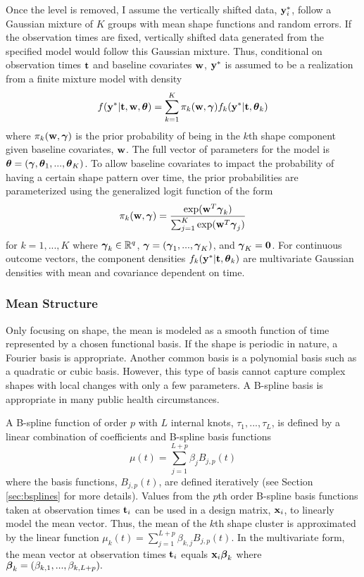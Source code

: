 Once the level is removed, I assume the vertically shifted data, $\mathbf y_{i}^{*}$, follow a Gaussian mixture of $K$ groups with mean shape functions and random errors. If the observation times are fixed, vertically shifted data generated from the specified model would follow this Gaussian mixture. Thus, conditional on observation times $\mathbf t$ and baseline covariates $\mathbf w$, $\mathbf y^{*}$ is assumed to be a realization from a finite mixture model with density
\begin{align*}
 f(\mathbf y^{*}|\mathbf t,\mathbf w,\boldsymbol\theta) =  \sum^{K}_{k=1}\pi_{k}(\mathbf w,\boldsymbol \gamma)f_{k}( \mathbf y^{*}|\mathbf t,\boldsymbol\theta_{k})
\end{align*}
where $\pi_{k}(\mathbf w,\boldsymbol \gamma)$ is the prior probability of being in the $k$th shape component given baseline covariates, $\mathbf w$. The full vector of parameters for the model is $\boldsymbol\theta = (\boldsymbol\gamma,\boldsymbol\theta_{1},...,\boldsymbol\theta_{K})$. To allow baseline covariates to impact the probability of having a certain shape pattern over time, the prior probabilities are parameterized using the generalized logit function of the form
$$\pi_{k}(\mathbf w,\boldsymbol\gamma)=\frac{\exp(\mathbf w^{T}\boldsymbol\gamma_{k})}{\sum_{j=1}^{K}\exp(\mathbf w^{T}\boldsymbol\gamma_{j})}$$ 
for $k=1,...,K$ where $\boldsymbol \gamma_{k}\in\mathbb{R}^{q}$, $\boldsymbol\gamma = (\boldsymbol\gamma_{1},...,\boldsymbol\gamma_{K})$, and $\boldsymbol\gamma_{K}=\mathbf 0$. For continuous outcome vectors, the component densities $f_{k}(\mathbf y^{*}|\mathbf t,\boldsymbol\theta_{k})$ are multivariate Gaussian densities with mean and covariance dependent  on time.

\subsubsection{Mean Structure}
Only focusing on shape, the mean is modeled as a smooth function of time represented by a chosen functional basis. If the shape is periodic in nature, a Fourier basis is appropriate. Another common basis is a polynomial basis such as a quadratic or cubic basis. However, this type of basis cannot capture complex shapes with local changes with only a few parameters. A B-spline basis is appropriate in many public health circumstances.

A B-spline function of order $p$ with $L$ internal knots, $\tau_{1},...,\tau_{L}$, is defined by a linear combination of coefficients and B-spline basis functions
$$\mu(t) = \sum^{L+p}_{j=1} \beta_j B_{j,p}(t)$$
where the basis functions, $B_{j,p}(t)$, are defined iteratively \cite{deboor1972,cox1972}  (see Section \ref{sec:bsplines} for more details). Values from the $p$th order B-spline basis functions taken at observation times $\mathbf t_{i}$ can be used in a design matrix, $\mathbf x_{i}$, to linearly model the mean vector. Thus, the mean of the $k$th shape cluster is approximated by the linear function $\mu_{k}(t) = \sum^{L+p}_{j=1} \beta_{k,j} B_{j,p}(t)$. In the multivariate form, the mean vector at observation times $\mathbf t_{i}$ equals $\mathbf x_{i}\boldsymbol\beta_{k}$ where $\boldsymbol\beta_{k}=(\beta_{k,1},...,\beta_{k, L+p}).$  

